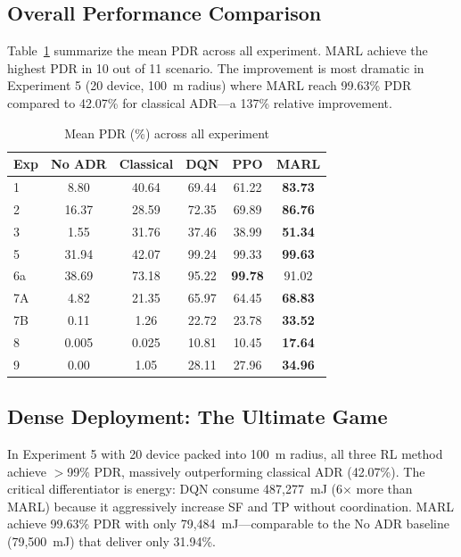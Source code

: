 \documentclass[conference]{IEEEtran}
\begin{document}
\subsection{Overall Performance Comparison}

Table~\ref{tab:summary} summarize the mean PDR across all experiment. MARL achieve the highest PDR in 10 out of 11 scenario. The improvement is most dramatic in Experiment 5 (20 device, 100~m radius) where MARL reach 99.63\% PDR compared to 42.07\% for classical ADR---a 137\% relative improvement.

\begin{table}[t]
\centering
\caption{Mean PDR (\%) across all experiment}
\label{tab:summary}
\footnotesize
\begin{tabular}{@{}lccccc@{}}
\toprule
\textbf{Exp} & \textbf{No ADR} & \textbf{Classical} & \textbf{DQN} & \textbf{PPO} & \textbf{MARL} \\
\midrule
1   & 8.80  & 40.64 & 69.44 & 61.22 & \textbf{83.73} \\
2   & 16.37 & 28.59 & 72.35 & 69.89 & \textbf{86.76} \\
3   & 1.55  & 31.76 & 37.46 & 38.99 & \textbf{51.34} \\
5   & 31.94 & 42.07 & 99.24 & 99.33 & \textbf{99.63} \\
6a  & 38.69 & 73.18 & 95.22 & \textbf{99.78} & 91.02 \\
\midrule
7A  & 4.82  & 21.35 & 65.97 & 64.45 & \textbf{68.83} \\
7B  & 0.11  & 1.26  & 22.72 & 23.78 & \textbf{33.52} \\
8   & 0.005 & 0.025 & 10.81 & 10.45 & \textbf{17.64} \\
9   & 0.00  & 1.05  & 28.11 & 27.96 & \textbf{34.96} \\
\bottomrule
\end{tabular}
\end{table}

\subsection{Dense Deployment: The Ultimate Game}

In Experiment 5 with 20 device packed into 100~m radius, all three RL method achieve $>$99\% PDR, massively outperforming classical ADR (42.07\%). The critical differentiator is energy: DQN consume 487,277~mJ (6$\times$ more than MARL) because it aggressively increase SF and TP without coordination. MARL achieve 99.63\% PDR with only 79,484~mJ---comparable to the No ADR baseline (79,500~mJ) that deliver only 31.94\%.
\end{document}
